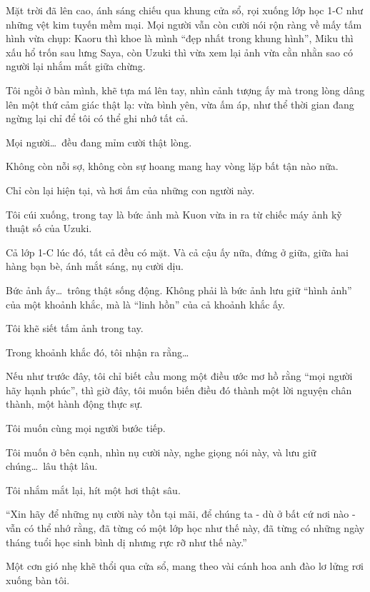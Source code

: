 \documentclass[../main.tex]{subfiles}
\begin{document}
\il

Mặt trời đã lên cao, ánh sáng chiếu qua khung cửa sổ, rọi xuống lớp học 1-C như những vệt kim tuyến mềm mại. Mọi người vẫn còn cười nói rộn ràng về mấy tấm hình vừa chụp: Kaoru thì khoe là mình ``đẹp nhất trong khung hình'', Miku thì xấu hổ trốn sau lưng Saya, còn Uzuki thì vừa xem lại ảnh vừa cằn nhằn sao có người lại nhắm mắt giữa chừng.

Tôi ngồi ở bàn mình, khẽ tựa má lên tay, nhìn cảnh tượng ấy mà trong lòng dâng lên một thứ cảm giác thật lạ: vừa bình yên, vừa ấm áp, như thể thời gian đang ngừng lại chỉ để tôi có thể ghi nhớ tất cả.

Mọi người\dots\ đều đang mỉm cười thật lòng.

Không còn nỗi sợ, không còn sự hoang mang hay vòng lặp bất tận nào nữa.

Chỉ còn lại hiện tại, và hơi ấm của những con người này.

Tôi cúi xuống, trong tay là bức ảnh mà Kuon vừa in ra từ chiếc máy ảnh kỹ thuật số của Uzuki.

Cả lớp 1-C lúc đó, tất cả đều có mặt. Và cả cậu ấy nữa, đứng ở giữa, giữa hai hàng bạn bè, ánh mắt sáng, nụ cười dịu.

Bức ảnh ấy\dots\ trông thật sống động. Không phải là bức ảnh lưu giữ ``hình ảnh'' của một khoảnh khắc, mà là ``linh hồn'' của cả khoảnh khắc ấy.

Tôi khẽ siết tấm ảnh trong tay.

Trong khoảnh khắc đó, tôi nhận ra rằng\dots

Nếu như trước đây, tôi chỉ biết cầu mong một điều ước mơ hồ rằng ``mọi người hãy hạnh phúc'', thì giờ đây, tôi muốn biến điều đó thành một lời nguyện chân thành, một hành động thực sự.

Tôi muốn cùng mọi người bước tiếp.

Tôi muốn ở bên cạnh, nhìn nụ cười này, nghe giọng nói này, và lưu giữ chúng\dots\ lâu thật lâu.

Tôi nhắm mắt lại, hít một hơi thật sâu.

\begin{center}
  ``Xin hãy để những nụ cười này tồn tại mãi, để chúng ta - dù ở bất cứ nơi nào -  vẫn có thể nhớ rằng, đã từng có một lớp học như thế này, đã từng có những ngày tháng tuổi học sinh bình dị nhưng rực rỡ như thế này.''
\end{center}

Một cơn gió nhẹ khẽ thổi qua cửa sổ, mang theo vài cánh hoa anh đào lơ lửng rơi xuống bàn tôi.
\end{document}
